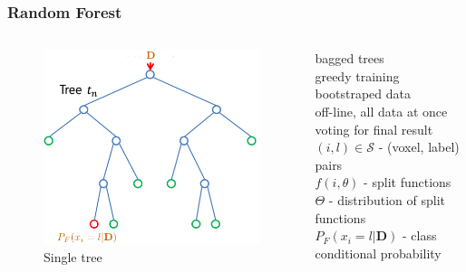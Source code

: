 \documentclass[mathserif, 10pt]{beamer}
\begin{document}
\begin{frame}
\frametitle{Random Forest}

\begin{columns}
 \begin{column}{0.5\textwidth}
  \begin{figure}
  \center
  \includegraphics[width=\textwidth]{figures/rf}
  \caption{Single tree}
\end{figure}
 \end{column}
 \begin{column}{0.5\textwidth}
    bagged trees\\
    greedy training\\
    bootstraped data\\    
    off-line, all data at once\\
    voting for final result\\    
    
    $(i, l) \in \mathcal{S}$ - (voxel, label) pairs\\
    $f(i, \theta)$ - split functions\\
    $\Theta$ - distribution of split functions\\
    $P_F(x_i = l | \mathbf{D})$ - class conditional probability\\
 \end{column}

\end{columns}
\end{frame}
\end{document}

